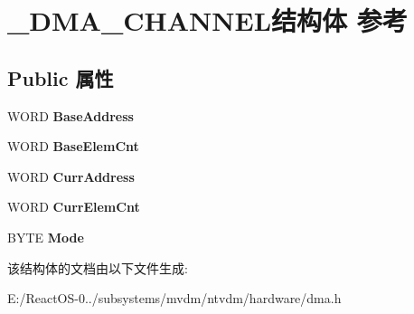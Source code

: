 \hypertarget{struct___d_m_a___c_h_a_n_n_e_l}{}\section{\+\_\+\+D\+M\+A\+\_\+\+C\+H\+A\+N\+N\+E\+L结构体 参考}
\label{struct___d_m_a___c_h_a_n_n_e_l}
\subsection*{Public 属性}
\begin{DoxyCompactItemize}
\item 
\mbox{\label{struct___d_m_a___c_h_a_n_n_e_l_ac5a248a4d780426b75b7346f615dd02d}} 
W\+O\+RD {\bfseries Base\+Address}
\item 
\mbox{\label{struct___d_m_a___c_h_a_n_n_e_l_a4823a54772c0d508a6ac28638ad4ae05}} 
W\+O\+RD {\bfseries Base\+Elem\+Cnt}
\item 
\mbox{\label{struct___d_m_a___c_h_a_n_n_e_l_ad8fcc04a71cd091c71672d01a23e883b}} 
W\+O\+RD {\bfseries Curr\+Address}
\item 
\mbox{\label{struct___d_m_a___c_h_a_n_n_e_l_a30549f7f550eb2d1bea266be9776b183}} 
W\+O\+RD {\bfseries Curr\+Elem\+Cnt}
\item 
\mbox{\label{struct___d_m_a___c_h_a_n_n_e_l_aa28162acdeb80f762fcd9f5264a6c8ad}} 
B\+Y\+TE {\bfseries Mode}
\end{DoxyCompactItemize}


该结构体的文档由以下文件生成\+:\begin{DoxyCompactItemize}
\item 
E\+:/\+React\+O\+S-\/0../subsystems/mvdm/ntvdm/hardware/dma.\+h\end{DoxyCompactItemize}
